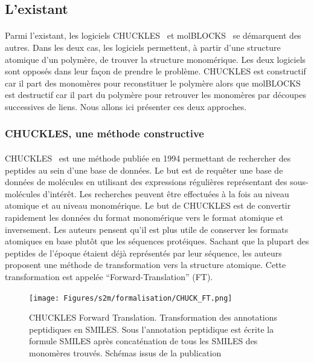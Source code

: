 \documentclass[12pt,french,twoside]{report}
\begin{document}
\subsection{L'existant}

\paragraph{}Parmi l'existant, les logiciels CHUCKLES~\cite{siani_chuckles:_1994} et molBLOCKS~\cite{ghersi_molblocks:_2014} se démarquent des autres.
Dans les deux cas, les logiciels permettent, à partir d'une structure atomique d'un polymère, de trouver la structure monomérique.
Les deux logiciels sont opposés dans leur façon de prendre le problème.
CHUCKLES est constructif car il part des monomères pour reconstituer le polymère alors que molBLOCKS est destructif car il part du polymère pour retrouver les monomères par découpes successives de liens.
Nous allons ici présenter ces deux approches.


\subsubsection{CHUCKLES, une méthode constructive}

\paragraph{}CHUCKLES~\cite{siani_chuckles:_1994} est une méthode publiée en 1994 permettant de rechercher des peptides au sein d'une base de données.
Le but est de requêter une base de données de molécules en utilisant des expressions régulières représentant des sous-molécules d'intérêt.
Les recherches peuvent être effectuées à la fois au niveau atomique et au niveau monomérique.
Le but de CHUCKLES est de convertir rapidement les données du format monomérique vers le format atomique et inversement.
Les auteurs pensent qu'il est plus utile de conserver les formats atomiques en base plutôt que les séquences protéiques.
Sachant que la plupart des peptides de l'époque étaient déjà représentés par leur séquence, les auteurs proposent une méthode de transformation vers la structure atomique.
Cette transformation est appelée ``Forward-Translation'' (FT).

\begin{figure}[!ht]
  \begin{center}
    \texttt{[image: Figures/s2m/formalisation/CHUCK\_FT.png]}
    \caption{\label{chuck_ft}CHUCKLES Forward Translation.
    Transformation des annotations peptidiques en SMILES.
    Sous l'annotation peptidique est écrite la formule SMILES après concaténation de tous les SMILES des monomères trouvés.
    Schémas issus de la publication}
  \end{center}
\end{figure}
\end{document}
